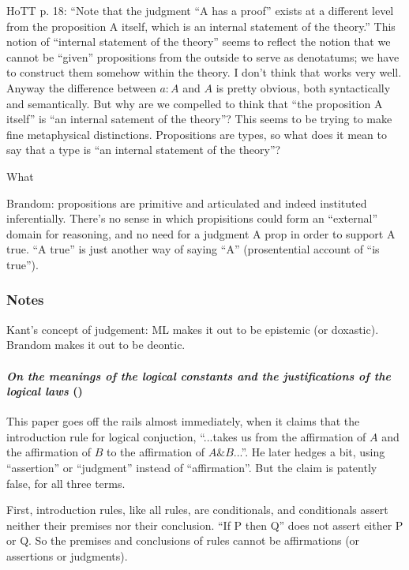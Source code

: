 \documentclass{article}
\begin{document}
HoTT p. 18: \enquote{Note that the judgment “A has a proof” exists at
  a different level from the proposition A itself, which is an
  internal statement of the theory.} This notion of ``internal
statement of the theory'' seems to reflect the notion that we cannot
be ``given'' propositions from the outside to serve as denotatums; we
have to construct them somehow within the theory. I don't think that
works very well. Anyway the difference between \(a:A\) and \(A\) is
pretty obvious, both syntactically and semantically. But why are we
compelled to think that ``the proposition A itself'' is ``an internal
satement of the theory''? This seems to be trying to make fine
metaphysical distinctions. Propositions are types, so what does it
mean to say that a type is ``an internal statement of the theory''?

What

Brandom: propositions are primitive and articulated and indeed
instituted inferentially. There's no sense in which propisitions could
form an ``external'' domain for reasoning, and no need for a judgment
A prop in order to support A true. ``A true'' is just another way of
saying ``A'' (prosentential account of ``is true'').

\subsubsection{Notes}

Kant's concept of judgement: ML makes it out to be epistemic (or
doxastic). Brandom makes it out to be deontic.

\paragraph{\textit{On the meanings of the logical constants and the justifications of the logical laws} (\parencite{martin1996meanings})
  \newline}

This paper goes off the rails almost immediately, when it claims that
the introduction rule for logical conjuction,
``...takes us from the affirmation of \(A\) and the affirmation of \(B\) to
the affirmation of \(A\&B\)...''. He later hedges a bit, using
``assertion'' or ``judgment'' instead of ``affirmation''. But the
claim is patently false, for all three terms.

First, introduction rules, like all rules, are conditionals, and
conditionals assert neither their premises nor their conclusion. ``If
P then Q'' does not assert either P or Q. So the premises and
conclusions of rules cannot be affirmations (or assertions or
judgments).
\end{document}
